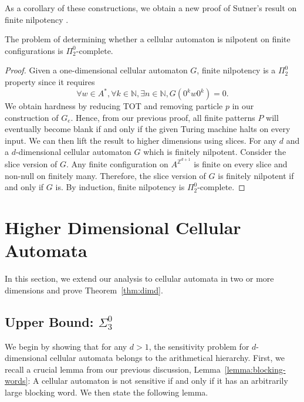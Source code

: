 \documentclass{llncs}
\begin{document}
As a corollary of these constructions, we obtain a new proof of Sutner's result on finite nilpotency \cite{sutner1989}.
\begin{corollary}
The problem of determining whether a cellular automaton is nilpotent on finite configurations is $\Pi^0_2$-complete.
\end{corollary}

\begin{proof}
Given a one-dimensional cellular automaton $G$, finite nilpotency is a $\Pi^0_2$ property since it requires  
\begin{equation}
\forall w\in A^*, \forall k \in \mathbb{N}, \exists n \in \mathbb{N}, G(0^k w 0^k) = 0.
\end{equation} 
We obtain hardness by reducing TOT and removing particle $p$ in our construction of $G_e$. Hence, from our previous proof, all finite patterns $P$ will eventually become blank if and only if the given Turing machine halts on every input. We can then lift the result to higher dimensions using slices. For any $d$ and a $d$-dimensional cellular automaton $G$ which is finitely nilpotent. Consider the slice version of $G$. Any finite configuration on $A^{\mathbb{Z}^{d+1}}$ is finite on every slice and non-null on finitely many. Therefore, the slice version of $G$ is finitely nilpotent if and only if $G$ is. By induction, finite nilpotency is $\Pi^0_2$-complete.

\end{proof}


 

\section{Higher Dimensional Cellular Automata}\label{sec:proof2}

In this section, we extend our analysis to cellular automata in two or more dimensions and prove Theorem~\ref{thm:dimd}.

\subsection{Upper Bound: $\Sigma^0_3$}

We begin by showing that for any $d > 1$, the sensitivity problem for $d$-dimensional cellular automata belongs to the arithmetical hierarchy. First, we recall a crucial lemma from our previous discussion, Lemma~\ref{lemma:blocking-words}: A cellular automaton is not sensitive if and only if it has an arbitrarily large blocking word. We then state the following lemma.
\end{document}
